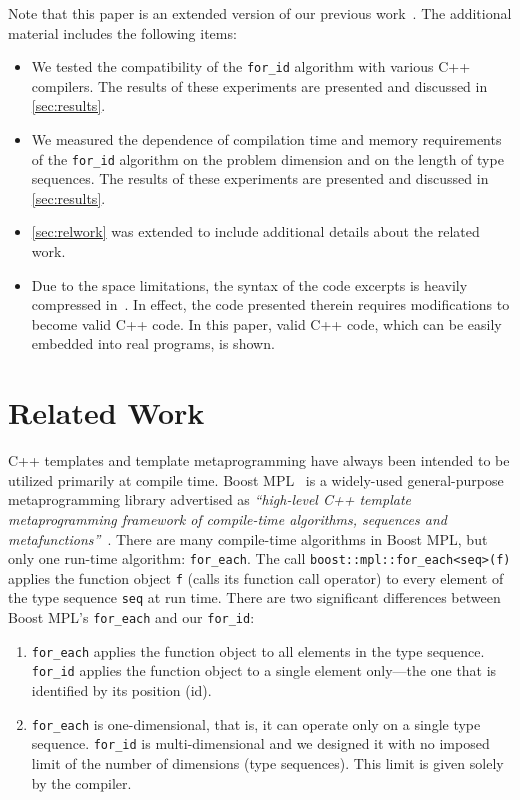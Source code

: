 \documentclass[10pt,a4paper]{article}
\theoremstyle{definition}\newtheorem{problem}{Problem}
\providecommand{\forid}{\texttt{for\_id}\xspace}
\providecommand{\foreach}{\texttt{for\_each}\xspace}
\begin{document}
Note that this paper is an extended version of our previous work~\cite{RefWorks:107}. The additional material includes the following items:
\begin{itemize}

\item We tested the compatibility of the \forid algorithm with various C++ compilers. The results of these experiments are presented and discussed in \autoref{sec:results}.

\item We measured the dependence of compilation time and memory requirements of the \forid algorithm on the problem dimension and on the length of type sequences. The results of these experiments are presented and discussed in \autoref{sec:results}.

\item \autoref{sec:relwork} was extended to include additional details about the related work. 
\item Due to the space limitations, the syntax of the code excerpts is heavily compressed in~\cite{RefWorks:107}. In effect, the code presented therein requires modifications to become valid C++ code. In this paper, valid C++ code, which can be easily embedded into real programs, is shown.



\end{itemize}

\section{Related Work}
\label{sec:relwork}

C++ templates and template metaprogramming have always been intended to be utilized primarily at compile time. Boost MPL~\cite{RefWorks:53} is a widely-used general-purpose metaprogramming library advertised as \textit{``high-level C++ template meta\-programming framework of compile-time algorithms, sequences and metafunctions''}~\cite{RefWorks:85}. There are many compile-time algorithms in Boost MPL, but only one run-time algorithm: \foreach. The call 
\texttt{boost::mpl::for\_each<seq>(f)}
applies the function object \texttt{f} (calls its function call operator) to every element of the type sequence \texttt{seq} at run time. There are two significant differences between Boost MPL's \foreach and our \forid:
\begin{enumerate}

\item \foreach applies the function object to all elements in the type sequence. \forid applies the function object to a single element only---the one that is identified by its position (id).

\item \foreach is one-dimensional, that is, it can operate only on a single type sequence. \forid is multi-dimensional
and we designed it with no imposed limit of the number of dimensions (type sequences). This limit is given solely by the compiler.

\end{enumerate}
\end{document}
